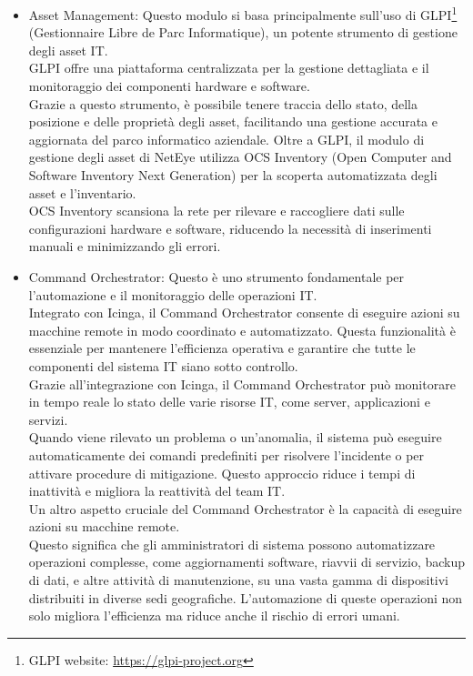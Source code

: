 \begin{itemize}
  \item Asset Management: Questo modulo si basa principalmente sull'uso di GLPI\footnote{GLPI
    website: \url{https://glpi-project.org}} (Gestionnaire Libre de Parc
    Informatique), un potente strumento di gestione degli asset IT.\\ GLPI offre
    una piattaforma centralizzata per la gestione dettagliata e il monitoraggio
    dei componenti hardware e software.\\ Grazie a questo strumento, è possibile
    tenere traccia dello stato, della posizione e delle proprietà degli asset, facilitando
    una gestione accurata e aggiornata del parco informatico aziendale. Oltre a
    GLPI, il modulo di gestione degli asset di NetEye utilizza OCS Inventory (Open
    Computer and Software Inventory Next Generation) per la scoperta automatizzata
    degli asset e l'inventario.\\ OCS Inventory scansiona la rete per rilevare e
    raccogliere dati sulle configurazioni hardware e software, riducendo la
    necessità di inserimenti manuali e minimizzando gli errori.

  \item Command Orchestrator: Questo è uno strumento fondamentale per l'automazione
    e il monitoraggio delle operazioni IT.\\ Integrato con Icinga, il Command Orchestrator
    consente di eseguire azioni su macchine remote in modo coordinato e automatizzato.
    Questa funzionalità è essenziale per mantenere l'efficienza operativa e
    garantire che tutte le componenti del sistema IT siano sotto controllo.\\
    Grazie all'integrazione con Icinga, il Command Orchestrator può monitorare in
    tempo reale lo stato delle varie risorse IT, come server, applicazioni e servizi.\\
    Quando viene rilevato un problema o un'anomalia, il sistema può eseguire
    automaticamente dei comandi predefiniti per risolvere l'incidente o per
    attivare procedure di mitigazione. Questo approccio riduce i tempi di inattività
    e migliora la reattività del team IT.\\ Un altro aspetto cruciale del Command
    Orchestrator è la capacità di eseguire azioni su macchine remote.\\ Questo significa
    che gli amministratori di sistema possono automatizzare operazioni complesse,
    come aggiornamenti software, riavvii di servizio, backup di dati, e altre attività
    di manutenzione, su una vasta gamma di dispositivi distribuiti in diverse
    sedi geografiche. L'automazione di queste operazioni non solo migliora l'efficienza
    ma riduce anche il rischio di errori umani.


\end{itemize}
